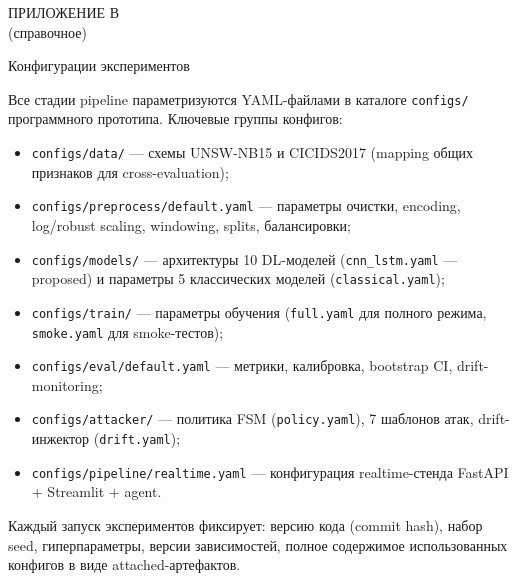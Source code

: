 \begin{center}
ПРИЛОЖЕНИЕ В\\
(справочное)

\medskip

Конфигурации экспериментов
\end{center}
\label{app:configs}

\vspace{6pt}

Все стадии pipeline параметризуются YAML-файлами в каталоге
\verb|configs/| программного прототипа. Ключевые группы конфигов:

\begin{itemize}
    \item \verb|configs/data/| --- схемы UNSW-NB15 и CICIDS2017
    (mapping общих признаков для cross-evaluation);
    \item \verb|configs/preprocess/default.yaml| --- параметры
    очистки, encoding, log/robust scaling, windowing, splits,
    балансировки;
    \item \verb|configs/models/| --- архитектуры 10 DL-моделей
    (\verb|cnn_lstm.yaml| --- proposed) и параметры 5 классических
    моделей (\verb|classical.yaml|);
    \item \verb|configs/train/| --- параметры обучения
    (\verb|full.yaml| для полного режима, \verb|smoke.yaml| для
    smoke-тестов);
    \item \verb|configs/eval/default.yaml| --- метрики, калибровка,
    bootstrap CI, drift-monitoring;
    \item \verb|configs/attacker/| --- политика FSM
    (\verb|policy.yaml|), 7 шаблонов атак, drift-инжектор
    (\verb|drift.yaml|);
    \item \verb|configs/pipeline/realtime.yaml| --- конфигурация
    realtime-стенда FastAPI + Streamlit + agent.
\end{itemize}

Каждый запуск экспериментов фиксирует: версию кода (commit hash),
набор seed, гиперпараметры, версии зависимостей, полное содержимое
использованных конфигов в виде attached-артефактов.

\label{lastfig}
\label{lasttab}

